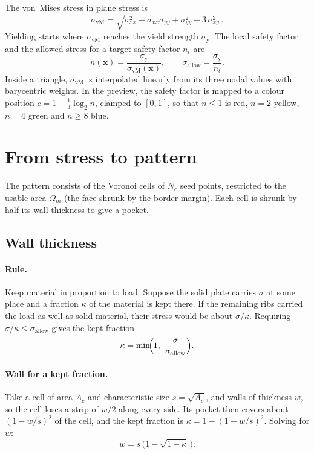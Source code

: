 \documentclass[11pt,a4paper]{article}
\newcommand{\vect}[1]{\mathbf{#1}}
\newcommand{\vm}{\sigma_{\mathrm{vM}}}
\newcommand{\allow}{\sigma_{\mathrm{allow}}}
\newcommand{\yield}{\sigma_{\mathrm{y}}}
\begin{document}
The von~Mises stress in plane stress is
\begin{equation}
  \vm = \sqrt{\sigma_{xx}^2 - \sigma_{xx}\sigma_{yy} + \sigma_{yy}^2
              + 3\,\sigma_{xy}^2}\, .
\end{equation}
Yielding starts where $\vm$ reaches the yield strength $\yield$. The local
safety factor and the allowed stress for a target safety factor $n_t$ are
\begin{equation}
  n(\vect{x}) = \frac{\yield}{\vm(\vect{x})},
  \qquad
  \allow = \frac{\yield}{n_t}.
\end{equation}
Inside a triangle, $\vm$ is interpolated linearly from its three nodal
values with barycentric weights. In the preview, the safety factor is mapped
to a colour position $c = 1 - \tfrac13\log_2 n$, clamped to $[0,1]$, so that
$n\le1$ is red, $n=2$ yellow, $n=4$ green and $n\ge8$ blue.

\section{From stress to pattern}

The pattern consists of the Voronoi cells of $N_c$ seed points, restricted to
the usable area $\Omega_m$ (the face shrunk by the border margin). Each cell
is shrunk by half its wall thickness to give a pocket.

\subsection{Wall thickness}

\paragraph{Rule.} Keep material in proportion to load. Suppose the solid
plate carries $\sigma$ at some place and a fraction $\kappa$ of the material
is kept there. If the remaining ribs carried the load as well as solid
material, their stress would be about $\sigma/\kappa$. Requiring
$\sigma/\kappa\le\allow$ gives the kept fraction
\begin{equation}
  \kappa = \min\!\Bigl(1,\ \frac{\sigma}{\allow}\Bigr).
  \label{eq:kappa}
\end{equation}

\paragraph{Wall for a kept fraction.} Take a cell of area $A_c$ and
characteristic size $s=\sqrt{A_c}$, and walls of thickness $w$, so the cell
loses a strip of $w/2$ along every side. Its pocket then covers about
$(1-w/s)^2$ of the cell, and the kept fraction is
$\kappa = 1-(1-w/s)^2$. Solving for $w$:
\begin{equation}
  w = s\,\bigl(1-\sqrt{1-\kappa}\,\bigr).
  \label{eq:wall}
\end{equation}
\end{document}
